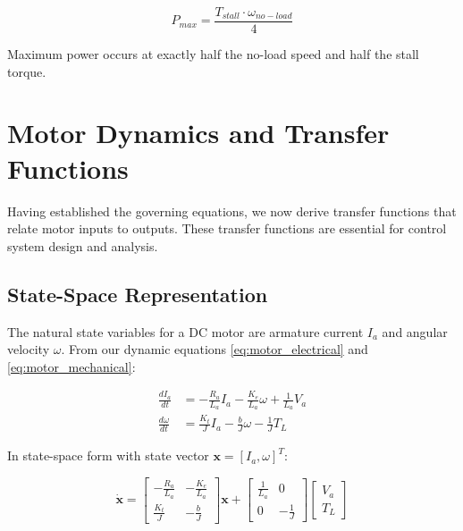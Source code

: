 \begin{equation}
    \boxed{P_{max} = \frac{T_{stall} \cdot \omega_{no-load}}{4}}
\end{equation}

Maximum power occurs at exactly half the no-load speed and half the stall torque.


\section{Motor Dynamics and Transfer Functions}
\label{sec:motor_transfer_functions}

Having established the governing equations, we now derive transfer functions that relate motor inputs to outputs. These transfer functions are essential for control system design and analysis.

\subsection{State-Space Representation}

The natural state variables for a DC motor are armature current $I_a$ and angular velocity $\omega$. From our dynamic equations \eqref{eq:motor_electrical} and \eqref{eq:motor_mechanical}:

\begin{equation}
    \begin{aligned}
        \frac{dI_a}{dt} &= -\frac{R_a}{L_a} I_a - \frac{K_e}{L_a} \omega + \frac{1}{L_a} V_a \\
        \frac{d\omega}{dt} &= \frac{K_t}{J} I_a - \frac{b}{J} \omega - \frac{1}{J} T_L
    \end{aligned}
\end{equation}

In state-space form with state vector $\mathbf{x} = [I_a, \omega]^T$:

\begin{equation}
    \boxed{
    \dot{\mathbf{x}} = \begin{bmatrix} -\frac{R_a}{L_a} & -\frac{K_e}{L_a} \\[6pt] \frac{K_t}{J} & -\frac{b}{J} \end{bmatrix} \mathbf{x} + \begin{bmatrix} \frac{1}{L_a} & 0 \\[6pt] 0 & -\frac{1}{J} \end{bmatrix} \begin{bmatrix} V_a \\ T_L \end{bmatrix}
    }
    \label{eq:motor_state_space}
\end{equation}

